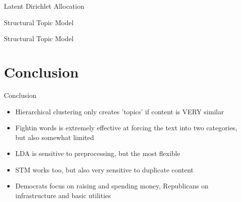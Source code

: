 \documentclass[12pt]{beamer}
\begin{document}
\begin{frame}{Latent Dirichlet Allocation}



\end{frame}

\begin{frame}{Structural Topic Model}
\end{frame}

\begin{frame}{Structural Topic Model}
\end{frame}

\section{Conclusion}
\begin{frame}{Conclusion}
\large
\begin{itemize}
	\item Hierarchical clustering only creates 'topics' if content is VERY similar
	\item Fightin words is extremely effective at forcing the text into two categories, but also somewhat limited
	\item LDA is sensitive to preprocessing, but the most flexible
	\item STM works too, but also very sensitive to duplicate content
	\vspace{5mm}
	\item Democrats focus on raising and spending money, Republicans on infrastructure and basic utilities
\end{itemize}
\end{frame}
\end{document}
